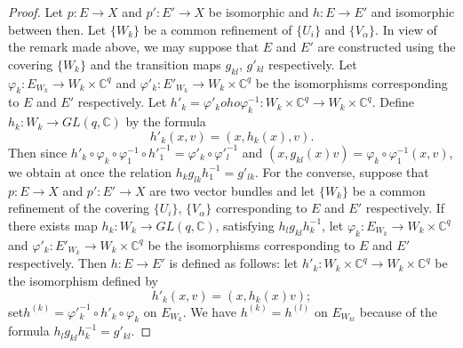 \begin{proof}
  Let $p:E \to X$ and $p':E' \to X$ be isomorphic and $h:E \to E'$ and
  isomorphic between  then. Let $\{ W_{k}\}$ be a common refinement of
  $\{ U_i \}$ and $\{ V_ \alpha \}$. In view of the remark made above,
  we may suppose that $E$ and $E'$ are constructed using the covering
  $\{ W_k \}$ and the transition maps $g_{kl}$, $g'_{kl}$
  respectively. Let $\varphi_k:E_{W_k} \to W_k \times \mathbb{C}^q$
  and $\varphi'_k:E'_{W_k} \to W_k \times \mathbb{C}^q$ be the
  isomorphisms corresponding to $E$ and $E'$ respectively. Let $h'_k
  =\varphi'_k oho \varphi^{-1}_k:W_k \times \mathbb{C}^q \to W_k
  \times \mathbb{C}^q$. Define $h_k:W_k \to GL(q, \mathbb{C})$ by
  the formula 
  $$
  h'_k(x,v)=(x,h_k (x),v).
  $$
  Then since $h'_k \circ \varphi_k \circ \varphi^{-1}_1 \circ h'^{-1}_1=\varphi'_k
  \circ \varphi'^{-1}_l$ and $(x, g_{kl}(x)v)=\varphi_k \circ \varphi^{-1}_1
  (x, v)$, we obtain at once the relation $h_k
  g_{lk}h^{-1}_1=g'_{lk}$. For the converse, suppose that $p: E \to X$
  and $p': E' \to X$ are two vector bundles and let $\{ W_k \}$ be a common
  refinement of the covering $\{ U_i \}$, $\{ V_ \alpha \}$
  corresponding to $E$ and $E'$ respectively. If there exists map
  $h_k:W_k \to GL (q, \mathbb{C})$, satisfying $h_l g_{kl} h_k^{-1}$,
  let $\varphi_k : E_{W_k} \to W_k \times \mathbb{C}^q$ and $\varphi'_k :
  E'_{W_k} \to W_k \times \mathbb{C}^q$ be the isomorphisms corresponding
  to $E$ and $E'$ respectively. Then $h : E \to E'$ is defined as
  follows: let $h'_k : W_k \times \mathbb{C}^q \to W_k \times 
  \mathbb{C}^q$ be the isomorphism defined by 
  $$
  h'_k (x,v)=(x,h_k(x)v);
  $$
  set\pageoriginale $h^{(k)}=\varphi'^{-1}_k \circ h'_k \circ \varphi_k$ on $E_{W_k}$. We
  have $h^{(k)}=h^{(l)}$ on $E_{W_{kl}}$ because of the formula $h_l
  g_{kl} h^{-1}_k=g'_{kl}$. 
\end{proof}

